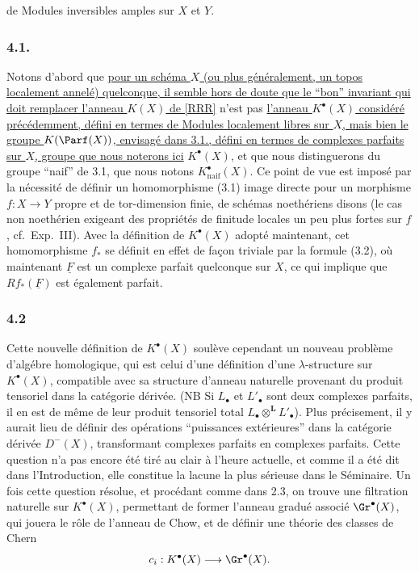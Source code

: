 de
Modules inversibles amples sur $X$ et $Y$.

\subsubsection*{4.1.}
Notons d'abord que \uline{pour un sch\'ema $X$ (ou plus g\'en\'eralement, un topos localement annel\'e) quelconque, il semble hors de doute que le ``bon'' invariant qui doit remplacer l'anneau $K(X)$ de [RRR]} n'est pas \uline{l'anneau $K^\bullet(X)$ consid\'er\'e pr\'ec\'edemment, d\'efini en termes de Modules localement libres sur $X$, mais bien le groupe $K(\Parf(X))$, envisag\'e dans 3.1., d\'efini en termes de complexes parfaits sur $X$, groupe que nous noterons ici} $K^\bullet(X)$, et que nous distinguerons du groupe ``naif'' de 3.1, que nous notons $K^\bullet_{\mathrm{naif}}(X)$. Ce point de vue est impos\'e par la n\'ecessit\'e de d\'efinir un homomorphisme (3.1) image directe pour un morphisme $f:X\to Y$ propre et de tor-dimension finie, de sch\'emas noeth\'eriens disons (le cas non noeth\'erien exigeant des propri\'et\'es de finitude locales un peu plus fortes sur $f$, cf.\ Exp.\ III). Avec la d\'efinition de $K^\bullet(X)$ adopt\'e maintenant, cet homomorphisme $f_*$ se d\'efinit en effet de fa\c{c}on triviale par la formule (3.2), o\`u maintenant $\underline F$ est un complexe parfait quelconque sur $X$, ce qui implique que $Rf_*(\underline F)$ est \'egalement parfait.

\subsubsection*{4.2}
Cette nouvelle d\'efinition de $K^\bullet(X)$ soul\`eve cependant un nouveau probl\`eme d'alg\'ebre homologique, qui est celui d'une d\'efinition d'une $\lambda$-structure sur $K^\bullet(X)$, compatible avec sa structure d'anneau naturelle provenant du produit tensoriel dans la cat\'egorie d\'eriv\'ee. (NB Si $L_\bullet$ et $L'_\bullet$ sont deux complexes parfaits, il en est de m\^eme de leur produit tensoriel total $L_\bullet\otimes^{\mathbf L}L'_\bullet$). Plus pr\'ecisement, il y aurait lieu de d\'efinir des op\'erations ``puissances ext\'erieures'' dans la cat\'egorie d\'eriv\'ee $D^-(X)$, transformant complexes parfaits en complexes parfaits. Cette question n'a pas encore \'et\'e tir\'e au clair \`a l'heure actuelle, et comme il a \'et\'e dit dans l'Introduction, elle constitue la lacune la plus s\'erieuse dans le S\'eminaire. Un fois cette question r\'esolue, et proc\'edant comme dans 2.3, on trouve une filtration naturelle sur $K^\bullet(X)$, permettant de former l'anneau gradu\'e associ\'e $\Gr^\bullet(X)$, qui jouera le r\^ole de l'anneau de Chow, et de d\'efinir une th\'eorie des classes de Chern
\[
c_i:K^\bullet(X)\longrightarrow \Gr^\bullet(X).
\]

